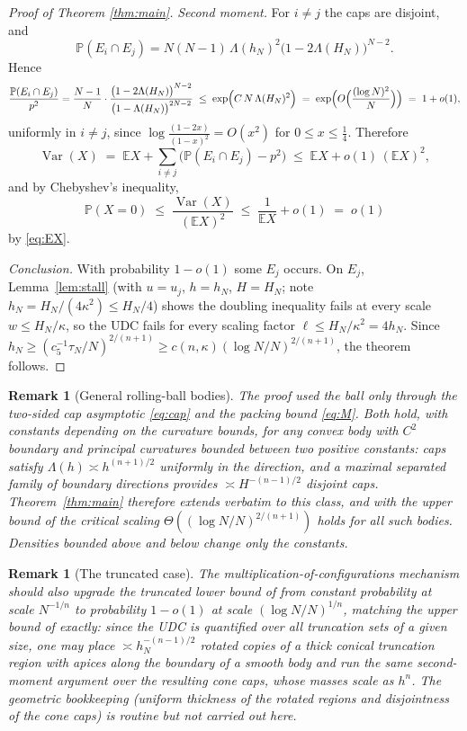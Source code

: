 \documentclass[11pt]{article}
\newtheorem{remark}[theorem]{Remark}
\newcommand{\E}{\mathbb{E}}
\newcommand{\PP}{\mathbb{P}}
\begin{document}
\begin{proof}[Proof of Theorem \ref{thm:main}]
\emph{Second moment.}  For $i\ne j$ the caps are disjoint, and
\[
\PP(E_i\cap E_j)
=N(N-1)\,\Lambda(h_N)^2\bigl(1-2\Lambda(H_N)\bigr)^{N-2}.
\]
Hence
\[
\frac{\PP(E_i\cap E_j)}{p^2}
=\frac{N-1}{N}\cdot
\frac{\bigl(1-2\Lambda(H_N)\bigr)^{N-2}}{\bigl(1-\Lambda(H_N)\bigr)^{2N-2}}
\;\le\;\exp\Bigl(C\,N\,\Lambda(H_N)^2\Bigr)
\;=\;\exp\Bigl(O\Bigl(\frac{(\log N)^2}{N}\Bigr)\Bigr)
\;=\;1+o(1),
\]
uniformly in $i\ne j$, since
$\log\frac{(1-2x)}{(1-x)^2}=O(x^2)$ for $0\le x\le\frac14$.  Therefore
\[
\operatorname{Var}(X)\;=\;\E X+\sum_{i\ne j}\bigl(\PP(E_i\cap E_j)-p^2\bigr)
\;\le\;\E X+o(1)\,(\E X)^2,
\]
and by Chebyshev's inequality,
\[
\PP(X=0)\;\le\;\frac{\operatorname{Var}(X)}{(\E X)^2}
\;\le\;\frac1{\E X}+o(1)\;=\;o(1)
\]
by \eqref{eq:EX}.

\emph{Conclusion.}  With probability $1-o(1)$ some $E_j$ occurs.  On $E_j$,
Lemma~\ref{lem:stall} (with $u=u_j$, $h=h_N$, $H=H_N$; note
$h_N=H_N/(4\kappa^2)\le H_N/4$) shows the doubling inequality fails at every
scale $w\le H_N/\kappa$, so the UDC fails for every scaling factor
$\ell\le H_N/\kappa^2=4h_N$.  Since
$h_N\ge(c_5^{-1}\tau_N/N)^{2/(n+1)}\ge c(n,\kappa)(\log N/N)^{2/(n+1)}$, the
theorem follows.
\end{proof}

\begin{remark}[General rolling-ball bodies]
The proof used the ball only through the two-sided cap asymptotic
\eqref{eq:cap} and the packing bound \eqref{eq:M}.  Both hold, with constants
depending on the curvature bounds, for any convex body with $C^2$ boundary and
principal curvatures bounded between two positive constants: caps satisfy
$\Lambda(h)\asymp h^{(n+1)/2}$ uniformly in the direction, and a maximal
separated family of boundary directions provides
$\asymp H^{-(n-1)/2}$ disjoint caps.  Theorem~\ref{thm:main} therefore extends
verbatim to this class, and with the upper bound of \cite{companion3} the
critical scaling $\Theta((\log N/N)^{2/(n+1)})$ holds for all such bodies.
Densities bounded above and below change only the constants.
\end{remark}

\begin{remark}[The truncated case]
The multiplication-of-configurations mechanism should also upgrade the
truncated lower bound of \cite{companion3} from constant probability at scale
$N^{-1/n}$ to probability $1-o(1)$ at scale $(\log N/N)^{1/n}$, matching the
upper bound of \cite{companion2} exactly: since the UDC is quantified over all
truncation sets of a given size, one may place
$\asymp h_N^{-(n-1)/2}$ rotated copies of a thick conical truncation region
with apices along the boundary of a smooth body and run the same second-moment
argument over the resulting cone caps, whose masses scale as $h^{n}$.  The
geometric bookkeeping (uniform thickness of the rotated regions and
disjointness of the cone caps) is routine but not carried out here.
\end{remark}
\end{document}
